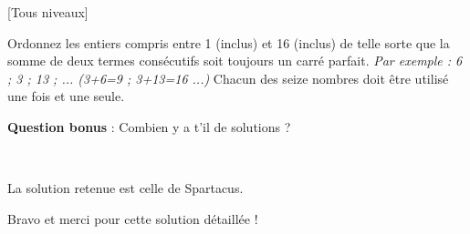 
%
[Tous niveaux]

\begin{center}
\end{center}

Ordonnez les entiers compris entre 1 (inclus) et 16 (inclus) de telle sorte que la somme de deux termes consécutifs soit toujours un carré parfait.
\textit{Par exemple : 6 ; 3 ; 13 ; ... (3+6=9 ; 3+13=16 ...)}
Chacun des seize nombres doit être utilisé une fois et une seule.
\par
\textbf{Question bonus} : Combien y a t'il de solutions ?
\par
~
\begin{solution}
     La solution retenue est celle de Spartacus. 
\par
Bravo et merci pour cette solution détaillée !
     \par
     [pdf-embedder url="/wp-content/uploads/slides/enigme-10-16/solution.pdf" width="676"]
\end{solution}
